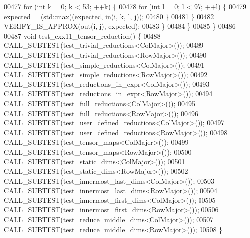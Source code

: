 \begin{DoxyCode}
00477       \textcolor{keywordflow}{for} (\textcolor{keywordtype}{int} k = 0; k < 53; ++k) \{
00478         \textcolor{keywordflow}{for} (\textcolor{keywordtype}{int} l = 0; l < 97; ++l) \{
00479           expected = (std::max)(expected, in(i, k, l, j));
00480         \}
00481       \}
00482       VERIFY\_IS\_APPROX(out(i, j), expected);
00483     \}
00484   \}
00485 \}
00486 
00487 \textcolor{keywordtype}{void} test\_cxx11\_tensor\_reduction() \{
00488   CALL\_SUBTEST(test\_trivial\_reductions<ColMajor>());
00489   CALL\_SUBTEST(test\_trivial\_reductions<RowMajor>());
00490   CALL\_SUBTEST(test\_simple\_reductions<ColMajor>());
00491   CALL\_SUBTEST(test\_simple\_reductions<RowMajor>());
00492   CALL\_SUBTEST(test\_reductions\_in\_expr<ColMajor>());
00493   CALL\_SUBTEST(test\_reductions\_in\_expr<RowMajor>());
00494   CALL\_SUBTEST(test\_full\_reductions<ColMajor>());
00495   CALL\_SUBTEST(test\_full\_reductions<RowMajor>());
00496   CALL\_SUBTEST(test\_user\_defined\_reductions<ColMajor>());
00497   CALL\_SUBTEST(test\_user\_defined\_reductions<RowMajor>());
00498   CALL\_SUBTEST(test\_tensor\_maps<ColMajor>());
00499   CALL\_SUBTEST(test\_tensor\_maps<RowMajor>());
00500   CALL\_SUBTEST(test\_static\_dims<ColMajor>());
00501   CALL\_SUBTEST(test\_static\_dims<RowMajor>());
00502   CALL\_SUBTEST(test\_innermost\_last\_dims<ColMajor>());
00503   CALL\_SUBTEST(test\_innermost\_last\_dims<RowMajor>());
00504   CALL\_SUBTEST(test\_innermost\_first\_dims<ColMajor>());
00505   CALL\_SUBTEST(test\_innermost\_first\_dims<RowMajor>());
00506   CALL\_SUBTEST(test\_reduce\_middle\_dims<ColMajor>());
00507   CALL\_SUBTEST(test\_reduce\_middle\_dims<RowMajor>());
00508 \}
\end{DoxyCode}
